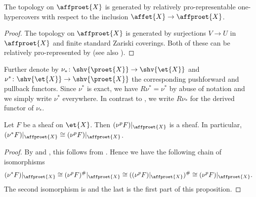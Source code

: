 \begin{lemma}
    The topology on $\affproet{X}$ is generated by relatively pro-representable one-hypercovers
    with respect to the inclusion $\affet{X} \to \affproet{X}$.
    \label{lemma:affproet-relatively-pro-prepresentable}
\end{lemma}

\begin{proof}
    The topology on $\affproet{X}$ is generated by surjections
    $V \to U$ in $\affproet{X}$ and finite standard Zariski coverings. Both
    of these can be relatively pro-represented by
     (see also ).
\end{proof}

Further denote by $\nu_{*} \colon \shv{\proet{X}} \to \shv{\et{X}}$ and
$\nu^* \colon \shv{\et{X}} \to \shv{\proet{X}}$ the corresponding pushforward and pullback functors.
Since $\nu^*$ is exact, we have $R \nu^* = \nu^*$ by abuse of notation and we simply write $\nu^*$ everywhere.
In contrast to \cite{proetale}, we write $R \nu_{*}$ for the derived functor of $\nu_{*}$.

\begin{proposition}
    Let $F$ be a sheaf on $\et{X}$. Then $(\nu^p F)|_{\affproet{X}}$ is a sheaf. In particular,
    $(\nu^*F)|_{\affproet{X}} \cong (\nu^p F)|_{\affproet{X}}$.
    \label{prop:presheaf-pushforward-sheaf-affproet}
    \leanok
\end{proposition}

\begin{proof}
    \leanok
    By  and
    , this follows from
    .
    Hence we have the following chain of isomorphisms
    \[
        (\nu^*F)|_{\affproet{X}} \cong (\nu^pF)^{\#}|_{\affproet{X}}
        \cong ((\nu^pF)|_{\affproet{X}})^{\#}
        \cong (\nu^pF)|_{\affproet{X}}
    .\] The second isomorphism is  and the last is the first part of this proposition.
\end{proof}

